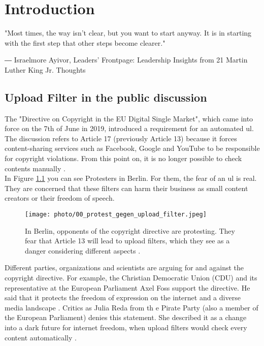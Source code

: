 \chapter{Introduction}
\label{ch:Introduction}
\epigraph{"Most times, the way isn’t clear, but you want to start anyway. It is in starting with the first step that other steps become clearer."}{― Israelmore Ayivor, Leaders' Frontpage: Leadership Insights from 21 Martin Luther King Jr. Thoughts}
\section{Upload Filter in the public discussion}
\label{sec:directiveCopyrightUploadFilters}

The "Directive on Copyright in the EU Digital Single Market", which came into force on the 7th of June in 2019,  introduced a requirement for an automated \gls{ul}. The discussion refers to Article 17 (previously Article 13) because it forces content-sharing services such as Facebook, Google and YouTube to be responsible for copyright violations. From this point on, it is no longer possible to check contents manually \cite{Emmawoollacott2019}.\\

In Figure \ref{fig:00_protest_gegen_upload_filter} you can see Protesters in Berlin. For them, the fear of an \gls{ul} is real. They are concerned that these filters can harm their business as small content creators or their freedom of speech.

\begin{figure}[!htp]
	\centering
	\texttt{[image: photo/00\_protest\_gegen\_upload\_filter.jpeg]}
	\caption{In Berlin, opponents of the copyright directive are protesting. They fear that Article 13 will lead to upload filters, which they see as a danger considering different aspects \cite{Protestg81:online}.}
	\label{fig:00_protest_gegen_upload_filter}
\end{figure}

Different parties, organizations and scientists are arguing for and against the copyright directive. For example, the Christian Democratic Union (CDU)  and its representative at the European Parliament Axel Foss support the directive.  He said that it protects the freedom of expression on the internet and a diverse media landscape \cite{Europarl2017}. Critics as Julia Reda from th e Pirate Party  (also a member of the European Parliament) denies this statement. She described it as a change into a dark future for internet freedom, when upload filters would check every content automatically \cite{Emmawoollacott2019}.\\

